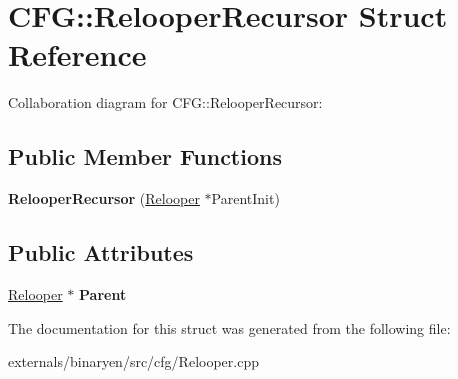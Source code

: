 \hypertarget{struct_c_f_g_1_1_relooper_recursor}{}\section{C\+FG\+:\+:Relooper\+Recursor Struct Reference}
\label{struct_c_f_g_1_1_relooper_recursor}


Collaboration diagram for C\+FG\+:\+:Relooper\+Recursor\+:
\subsection*{Public Member Functions}
\begin{DoxyCompactItemize}
\item 
\mbox{\label{struct_c_f_g_1_1_relooper_recursor_af6696cfe0cc8108feadcf828cea5f9e1}} 
{\bfseries Relooper\+Recursor} (\mbox{\hyperlink{struct_c_f_g_1_1_relooper}{Relooper}} $\ast$Parent\+Init)
\end{DoxyCompactItemize}
\subsection*{Public Attributes}
\begin{DoxyCompactItemize}
\item 
\mbox{\label{struct_c_f_g_1_1_relooper_recursor_a43a9dea3a41c72b1136d4c5aa7c3bbae}} 
\mbox{\hyperlink{struct_c_f_g_1_1_relooper}{Relooper}} $\ast$ {\bfseries Parent}
\end{DoxyCompactItemize}


The documentation for this struct was generated from the following file\+:\begin{DoxyCompactItemize}
\item 
externals/binaryen/src/cfg/Relooper.\+cpp\end{DoxyCompactItemize}
